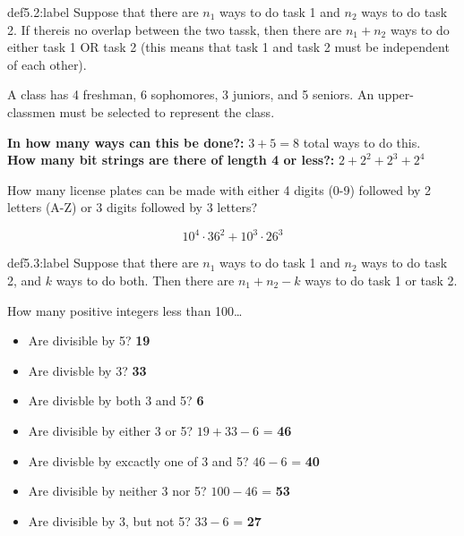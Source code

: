 \begin{definition}{def5.2:label}
    Suppose that there are $n_1$ ways to do task 1 and $n_2$ ways to do task 2. If thereis no overlap between the two tassk, then there are $n_1+n_2$ ways to do either task 1 OR task 2 (this means that task 1 and task 2 must be independent of each other).
\end{definition}

\begin{problem}
    A class has 4 freshman, 6 sophomores, 3 juniors, and 5 seniors. An upper-classmen must be selected to represent the class. 
    
    \textbf{In how many ways can this be done?:} $3 + 5 = 8$ total ways to do this.\\

    \textbf{How many bit strings are there of length 4 or less?:} $2 + 2^2 + 2^3 + 2^4$\\
\end{problem}

\begin{problem}
    How many license plates can be made with either 4 digits (0-9) followed by 2 letters (A-Z) or 3 digits followed by 3 letters?

    $$
    10^4 \cdot 36^2 + 10^3 \cdot 26^3
    $$
\end{problem}


\begin{definition}{def5.3:label}
    Suppose that there are $n_1$ ways to do task 1 and $n_2$ ways to do task 2, and $k$ ways to do both. Then there are $n_1+n_2-k$ ways to do task 1 or task 2.
\end{definition}

\begin{problem}
    How many positive integers less than 100\dots

    \begin{itemize}
        \item Are divisible by 5? \textbf{19}
        \item Are divisble by 3? \textbf{33}
        \item Are divisble by both 3 and 5? \textbf{6}
        \item Are divisible by either 3 or 5? $19+33-6$ = \textbf{46}
        \item Are divisble by excactly one of 3 and 5? $46-6$ = \textbf{40}
        \item Are divisible by neither 3 nor 5? $100 - 46$ = \textbf{53}
        \item Are divisible by 3, but not 5? $33-6$ = \textbf{27}
    \end{itemize}
\end{problem}




